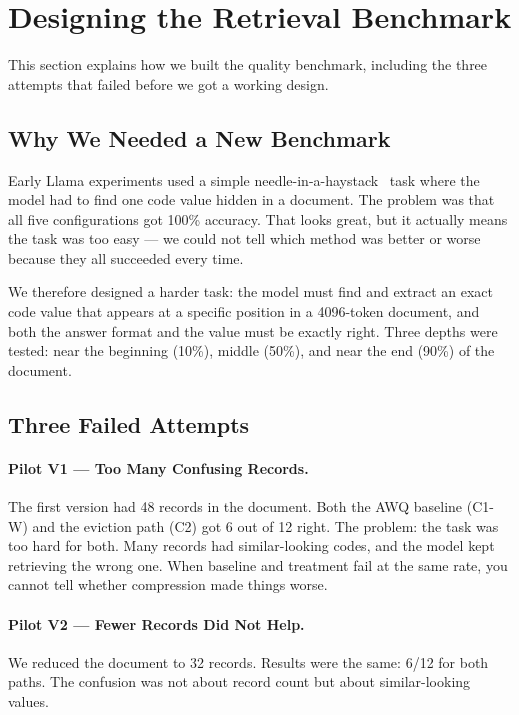 \documentclass[sigconf,nonacm]{acmart}
\begin{document}
\section{Designing the Retrieval Benchmark}
\label{sec:benchmark}

This section explains how we built the quality benchmark, including the three
attempts that failed before we got a working design.

\subsection{Why We Needed a New Benchmark}

Early Llama experiments used a simple needle-in-a-haystack~\cite{kamradt2023needle} task where the model
had to find one code value hidden in a document. The problem was that all five
configurations got 100\% accuracy. That looks great, but it actually means the
task was too easy --- we could not tell which method was better or worse because
they all succeeded every time.

We therefore designed a harder task: the model must find and extract an exact code
value that appears at a specific position in a 4096-token document, and both the
answer format and the value must be exactly right. Three depths were tested: near
the beginning (10\%), middle (50\%), and near the end (90\%) of the document.

\subsection{Three Failed Attempts}

\paragraph{Pilot V1 --- Too Many Confusing Records.}
The first version had 48 records in the document. Both the AWQ baseline (C1-W)
and the eviction path (C2) got 6 out of 12 right. The problem: the task was too
hard for both. Many records had similar-looking codes, and the model kept
retrieving the wrong one. When baseline and treatment fail at the same rate, you
cannot tell whether compression made things worse.

\paragraph{Pilot V2 --- Fewer Records Did Not Help.}
We reduced the document to 32 records. Results were the same: 6/12 for both
paths. The confusion was not about record count but about similar-looking values.
\end{document}
